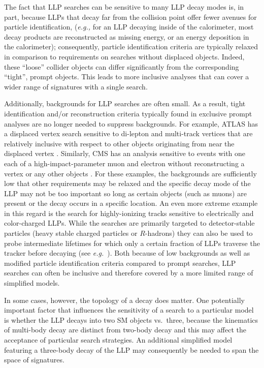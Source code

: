 The fact that LLP searches can be sensitive to many LLP decay modes is, in part,
because LLPs that decay far from the collision point offer fewer
avenues for particle identification, (\emph{e.g.,} for an LLP decaying
inside of the calorimeter, most decay products are reconstructed as missing
energy, or an energy deposition in the calorimeter); consequently, particle identification
criteria are typically relaxed in comparison to requirements on searches without
displaced objects. Indeed, these ``loose'' collider objects can
differ significantly from the corresponding ``tight'', prompt objects. This leads to more 
inclusive analyses that can cover a wider range of signatures with a single search.


 Additionally,  backgrounds for LLP searches
are often small. As a result,  tight identification and/or reconstruction
criteria typically found in exclusive prompt analyses are  no longer needed to suppress
backgrounds. For example, ATLAS has a displaced vertex search
sensitive to di-lepton and multi-track vertices that are relatively
inclusive with respect to other objects originating from near the displaced vertex
\cite{Aad:2015rba}. Similarly, CMS has an analysis sensitive to
events with one each of a high-impact-parameter muon and electron without reconstructing a vertex or any other objects
\cite{CMS-PAS-EXO-16-022}. For these examples, the backgrounds are sufficiently low that other requirements may be relaxed and the specific decay mode of the LLP may not be too important so long as certain objects (such as muons) are present or the decay occurs in a specific location. An even more extreme example in this regard is the search for highly-ionizing tracks sensitive to electrically and color-charged LLPs. While the searches are primarily targeted to detector-stable particles (heavy stable charged particles or $R$-hadrons) they can also be used to probe intermediate lifetimes for which only a certain fraction of LLPs traverse the tracker before decaying (see \emph{e.g.}~\cite{Garny:2017rxs}). Both because of low backgrounds as well as modified particle identification criteria compared to prompt searches, LLP searches can often be inclusive and therefore covered by a more limited range of simplified models.

In some cases, however, the topology of a decay does matter. One potentially important factor
 that influences the sensitivity of a search to a particular model is whether
 the LLP decays into two SM objects vs.~three, because the kinematics of multi-body
decay are distinct from two-body decay and this may affect the 
acceptance of particular search strategies.  An additional simplified model 
  featuring a three-body decay of the LLP may consequently be needed to span
  the space of signatures.
  
